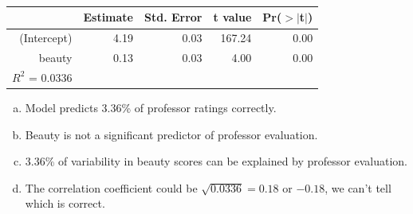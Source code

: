 
\begin{frame}
\frametitle{}


\begin{center}
{\small
\begin{tabular}{rrrrr}
  \hline
 & Estimate & Std. Error & t value & Pr($>$$|$t$|$) \\ 
  \hline
(Intercept) & 4.19 & 0.03 & 167.24 & 0.00 \\ 
  beauty & 0.13 & 0.03 & 4.00 & 0.00 \\
   \hline
$R^2$ = 0.0336
\end{tabular}
}
\end{center}

\begin{enumerate}[(a)]
\item Model predicts 3.36\% of professor ratings correctly.
\item Beauty is not a significant predictor of professor evaluation.
\item 3.36\% of variability in beauty scores can be explained by professor evaluation.
\item The correlation coefficient could be $\sqrt{0.0336} = 0.18$ or $-0.18$, we can't tell which is correct.
\end{enumerate}

\end{frame}


